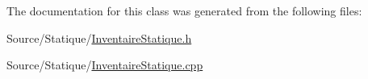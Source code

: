 The documentation for this class was generated from the following files\-:\begin{DoxyCompactItemize}
\item 
Source/\-Statique/\hyperlink{InventaireStatique_8h}{Inventaire\-Statique.\-h}\item 
Source/\-Statique/\hyperlink{Statique_2InventaireStatique_8cpp}{Inventaire\-Statique.\-cpp}\end{DoxyCompactItemize}
